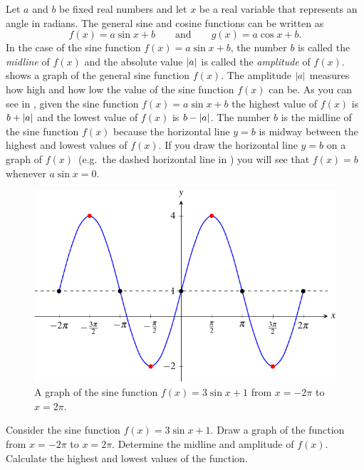 \documentclass[a4paper,oneside,12pt]{article}
\begin{document}
Let $a$ and $b$ be fixed real numbers and let $x$ be a real variable
that represents an angle in radians.  The general sine and cosine
functions can be written as
\begin{equation}
\label{eqn:trigonometric:general_sine_cosine}
f(x)
=
a \sin x + b
\qquad
\text{and}
\qquad
g(x)
=
a \cos x + b.
\end{equation}
In the case of the sine function $f(x) = a \sin x + b$, the number $b$
is called the \emph{midline} of $f(x)$ and the absolute value
$\lvert a\rvert$ is called the \emph{amplitude} of $f(x)$.
 shows a graph of the general
sine function $f(x)$.  The amplitude $\lvert a\rvert$ measures how
high and how low the value of the sine function $f(x)$ can be.  As you
can see in , given the sine
function $f(x) = a \sin x + b$ the highest value of $f(x)$ is
$b + \lvert a\rvert$ and the lowest value of $f(x)$ is
$b - \lvert a\rvert$.  The number $b$ is the midline of the sine
function $f(x)$ because the horizontal line $y = b$ is midway between
the highest and lowest values of $f(x)$.  If you draw the horizontal
line $y = b$ on a graph of $f(x)$~(e.g.~the dashed horizontal line in
) you will see that $f(x) = b$
whenever $a \sin x = 0$.

\begin{figure}[!htbp]
\centering
\includegraphics[scale=1.1]{image/13/3-sin-1.pdf}
\caption{%
  A graph of the sine function $f(x) = 3 \sin x + 1$ from
  $x = -2\pi$ to $x = 2\pi$.
}
\label{fig:trigonometric:sine_3_sin_1}
\end{figure}

\begin{example}
Consider the sine function $f(x) = 3 \sin x + 1$.  Draw a graph of the
function from $x = -2\pi$ to $x = 2\pi$.  Determine the midline and
amplitude of $f(x)$.  Calculate the highest and lowest values of the
function.
\end{example}
\end{document}
